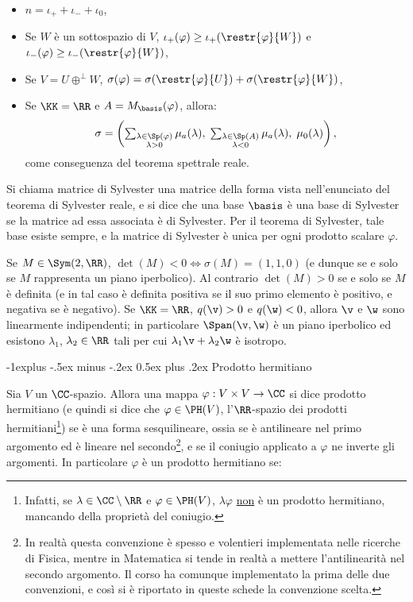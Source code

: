 \documentclass[10pt,landscape]{article}
\makeatletter
\renewcommand{\subsection}{\@startsection{subsection}{2}{0mm}%
	{-1explus -.5ex minus -.2ex}%
	{0.5ex plus .2ex}%
	{\normalfont\normalsize\bfseries}}
\makeatother
\begin{document}
\begin{multicols}{3}
\begin{itemize}
			\item $n = \iota_+ + \iota_- + \iota_0$,
			
			\item Se $W$ è un sottospazio di $V$, $\iota_+(\varphi) \geq \iota_+(\restr{\varphi}{W})$ e
			$\iota_-(\varphi) \geq \iota_-(\restr{\varphi}{W})$,
			
			\item Se $V = U \oplus^\perp W$, $\sigma(\varphi) = \sigma(\restr{\varphi}{U}) + \sigma(\restr{\varphi}{W})$,
			
			\item Se $\KK = \RR$ e $A = M_\basis(\varphi)$, allora: 
			\[ \sigma = \textstyle \left( \sum_{\substack{\lambda \in \Sp(\varphi) \\ \lambda > 0}} \mu_a(\lambda), \; \sum_{\substack{\lambda \in \Sp(A) \\ \lambda < 0}} \mu_a(\lambda), \; \mu_0(\lambda) \right), \]			
			come conseguenza del teorema spettrale reale.
		\end{itemize}
		
		Si chiama matrice di Sylvester una matrice della forma vista nell'enunciato del teorema di Sylvester
		reale, e si dice che una base $\basis$ è una base di Sylvester se la matrice ad essa associata è di
		Sylvester. Per il teorema di Sylvester, tale base esiste sempre, e la matrice di Sylvester è unica per
		ogni prodotto scalare $\varphi$.
		
		Se $M \in \Sym(2, \RR)$, $\det(M) < 0 \iff \sigma(M) = (1, 1, 0)$ (e dunque
		se e solo se $M$ rappresenta un piano iperbolico). Al contrario $\det(M) > 0$
		se e solo se $M$ è definita (e in tal caso è definita positiva se il suo
		primo elemento è positivo, e negativa se è negativo). Se $\KK=\RR$, $q(\v) > 0$ e $q(\w) < 0$,
		allora $\v$ e $\w$ sono linearmente indipendenti; in particolare $\Span(\v, \w)$ è
		un piano iperbolico ed esistono $\lambda_1$, $\lambda_2 \in \RR$ tali per
		cui $\lambda_1 \v + \lambda_2 \w$ è isotropo.
		
		\subsection{Prodotto hermitiano}
		
		Sia $V$ un $\CC$-spazio. Allora una mappa $\varphi : V \times V \to \CC$ si
		dice prodotto hermitiano (e quindi si dice che $\varphi \in \PH(V)$, l'$\RR$-spazio dei
		prodotti hermitiani\footnote{Infatti, se $\lambda \in \CC \setminus \RR$ e $\varphi \in \PH(V)$, $\lambda \varphi$ \underline{non} è un prodotto hermitiano, mancando della proprietà del coniugio.}) se è una forma sesquilineare, ossia se è antilineare
		nel primo argomento ed è lineare nel secondo\footnote{In realtà questa convenzione è spesso e volentieri implementata nelle ricerche di Fisica, mentre in Matematica si tende in realtà a mettere l'antilinearità nel secondo argomento. Il corso ha comunque implementato la prima delle due convenzioni, e così si è riportato in queste schede la convenzione scelta.}, e se il coniugio applicato a $\varphi$ ne inverte gli argomenti. In particolare $\varphi$ è un prodotto hermitiano se:
		

\end{multicols}
\end{document}
